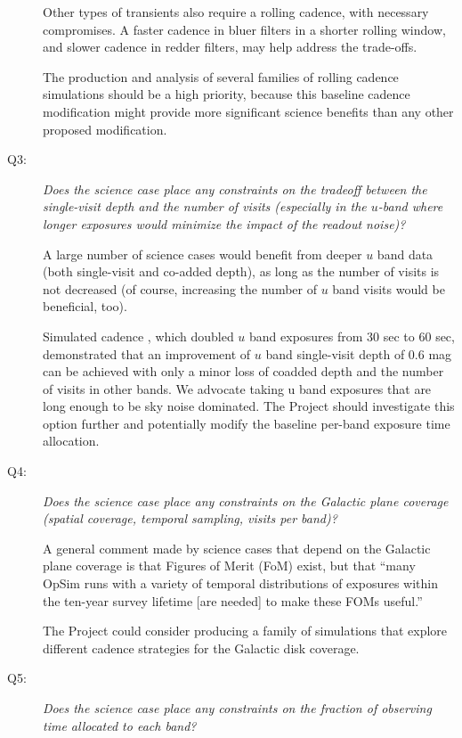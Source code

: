 \begin{description}
Other types of transients also require a rolling cadence, with necessary compromises.  A faster cadence in
bluer filters in a shorter rolling window, and slower cadence in redder filters, may help address the
trade-offs.

The production and analysis of several families of rolling cadence
simulations should be a high priority, because this
baseline cadence modification might provide more significant science
benefits than any other proposed modification.


\item[Q3:] {\it Does the science case place any constraints on the
tradeoff between the single-visit depth and the number of visits
(especially in the $u$-band where longer exposures would minimize the
impact of the readout noise)?}


A large number of science cases would benefit from deeper $u$ band data
(both single-visit and co-added depth), as long as the number of visits
is not decreased (of course, increasing the number of $u$ band visits
would be beneficial, too).

Simulated cadence , which
doubled $u$ band exposures from 30 sec to 60 sec, demonstrated that an
improvement of $u$ band single-visit depth of 0.6 mag can be achieved
with only a minor loss of coadded depth and the number of visits in other bands.
We advocate taking u band exposures that are long enough to be sky noise dominated.
The Project should investigate this option further and potentially
modify the baseline per-band exposure time allocation.


\item[Q4:] {\it Does the science case place any constraints on the
Galactic plane coverage (spatial coverage, temporal sampling, visits per
band)?}

A general comment made by science cases that depend on the Galactic
plane coverage is that Figures of Merit (FoM) exist, but that ``many
OpSim runs with a variety of temporal distributions of exposures within
the ten-year survey lifetime [are needed] to make these FOMs useful.''

The Project could consider producing a family of simulations that explore
different cadence strategies for the Galactic disk coverage.


\item[Q5:] {\it Does the science case place any constraints on the
fraction of observing time allocated to each band?}


\end{description}
